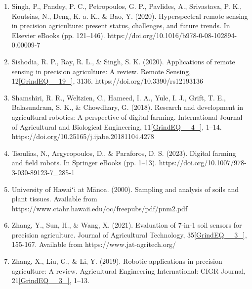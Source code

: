 \documentclass{book} %
\begin{document}
\begin{enumerate}
\item  Singh, P., Pandey, P. C., Petropoulos, G. P., Pavlides, A., Srivastava, P. K., Koutsias, N., Deng, K. a. K., \& Bao, Y. (2020). Hyperspectral remote sensing in precision agriculture: present status, challenges, and future trends. In Elsevier eBooks (pp. 121--146). https://doi.org/10.1016/b978-0-08-102894-0.00009-7\underbar{  }

\item  Sishodia, R. P., Ray, R. L., \& Singh, S. K. (2020). Applications of remote sensing in precision agriculture: A review. Remote Sensing, 12\eqref{GrindEQ__19_}, 3136. https://doi.org/10.3390/rs12193136

\item  Shamshiri, R. R., Weltzien, C., Hameed, I. A., Yule, I. J., Grift, T. E., Balasundram, S. K., \& Chowdhary, G. (2018). Research and development in agricultural robotics: A perspective of digital farming. International Journal of Agricultural and Biological Engineering, 11\eqref{GrindEQ__4_}, 1--14. https://doi.org/10.25165/j.ijabe.20181104.4278

\item  Tsoulias, N., Argyropoulos, D., \& Paraforos, D. S. (2023). Digital farming and field robots. In Springer eBooks (pp. 1--13). https://doi.org/10.1007/978-3-030-89123-7\_285-1

\item  University of Hawaiʻi at M\={a}noa. (2000). Sampling and analysis of soils and plant tissues. Available from https://www.ctahr.hawaii.edu/oc/freepubs/pdf/pnm2.pdf

\item  Zhang, Y., Sun, H., \& Wang, X. (2021). Evaluation of 7-in-1 soil sensors for precision agriculture. Journal of Agricultural Technology, 35\eqref{GrindEQ__3_}, 155-167. Available from https://www.jat-agritech.org/

\item  Zhang, X., Liu, G., \& Li, Y. (2019). Robotic applications in precision agriculture: A review. Agricultural Engineering International: CIGR Journal, 21\eqref{GrindEQ__3_}, 1--13.
\end{enumerate}

\noindent 
\end{document}

